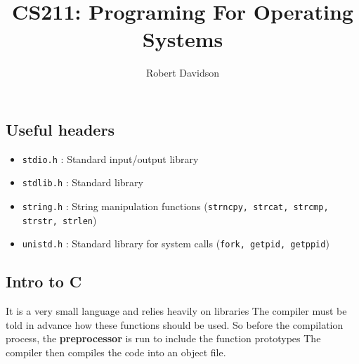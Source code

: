 \documentclass[a4paper, 10pt]{article}
\title{
\textbf{CS211: Programing For Operating Systems} \\ 
}
\author{
Robert Davidson
}
\date{}
\begin{document}
\maketitle
\pagebreak

\tableofcontents
\pagebreak
\subsection*{Useful headers}
\begin{itemize}
    \item \texttt{stdio.h} : Standard input/output library
    \item \texttt{stdlib.h} : Standard library
    \item  \texttt{string.h} : String manipulation functions (\texttt{strncpy, strcat, strcmp, strstr, strlen})
    \item \texttt{unistd.h} : Standard library for system calls (\texttt{fork, getpid, getppid})
\end{itemize}
\pagebreak
\subsection{Intro to C}

It is a very small language and relies heavily on libraries
The compiler must be told in advance how these functions should be used. So before the compilation process, the \textbf{preprocessor} is run to include the function prototypes The compiler then compiles the code into an object file.
\end{document}
